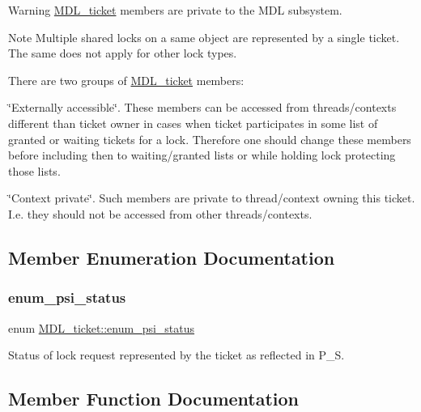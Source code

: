 \begin{DoxyWarning}{Warning}
\mbox{\hyperlink{classMDL__ticket}{M\+D\+L\+\_\+ticket}} members are private to the M\+DL subsystem.
\end{DoxyWarning}
\begin{DoxyNote}{Note}
Multiple shared locks on a same object are represented by a single ticket. The same does not apply for other lock types.

There are two groups of \mbox{\hyperlink{classMDL__ticket}{M\+D\+L\+\_\+ticket}} members\+:
\begin{DoxyItemize}
\item \char`\"{}\+Externally accessible\char`\"{}. These members can be accessed from threads/contexts different than ticket owner in cases when ticket participates in some list of granted or waiting tickets for a lock. Therefore one should change these members before including then to waiting/granted lists or while holding lock protecting those lists.
\item \char`\"{}\+Context private\char`\"{}. Such members are private to thread/context owning this ticket. I.\+e. they should not be accessed from other threads/contexts. 
\end{DoxyItemize}
\end{DoxyNote}


\subsection{Member Enumeration Documentation}
\mbox{\label{classMDL__ticket_aac8808e99159aafeabd6ed1bde13894f}} 
\subsubsection{\texorpdfstring{enum\+\_\+psi\+\_\+status}{enum\_psi\_status}}
{\footnotesize\ttfamily enum \mbox{\hyperlink{classMDL__ticket_aac8808e99159aafeabd6ed1bde13894f}{M\+D\+L\+\_\+ticket\+::enum\+\_\+psi\+\_\+status}}}

Status of lock request represented by the ticket as reflected in P\+\_\+S. 

\subsection{Member Function Documentation}
\mbox{\label{classMDL__ticket_af1bd23371e97d8bf6b0ff9de43e7e418}} 
